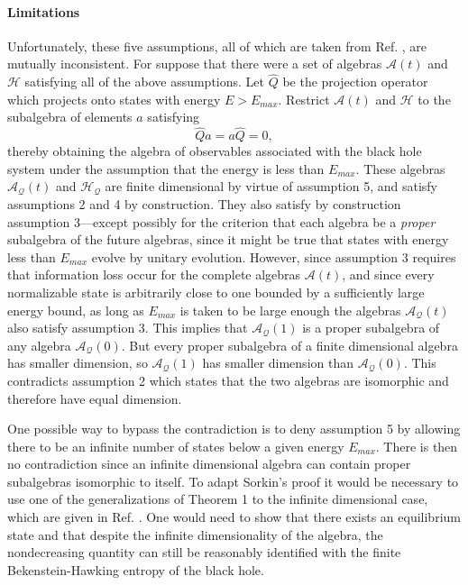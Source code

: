 \documentclass[12pt]{article}
\begin{document}
\paragraph{Limitations}

Unfortunately, these five assumptions, all of which are taken from Ref. \cite{sorkin86}, are mutually inconsistent.  For suppose that there were a set of algebras $\mathcal{A}(t)$ and $\mathcal{H}$ satisfying all of the above assumptions.  Let $\hat{Q}$ be the projection operator which projects onto states with energy $E > E_{max}$.  Restrict $\mathcal{A}(t)$ and $\mathcal{H}$ to the subalgebra of elements $a$ satisfying
\begin{equation}
\hat{Q}a = a\hat{Q} = 0,
\end{equation}
thereby obtaining the algebra of observables associated with the black hole system under the assumption that the energy is less than $E_{max}$.  These algebras $\mathcal{A_Q}(t)$ and $\mathcal{H_Q}$ are finite dimensional by virtue of assumption 5, and satisfy assumptions 2 and 4 by construction.  They also satisfy by construction assumption 3---except possibly for the criterion that each algebra be a \emph{proper} subalgebra of the future algebras, since it might be true that states with energy less than $E_{max}$ evolve by unitary evolution.  However, since assumption 3 requires that information loss occur for the complete algebras $\mathcal{A}(t)$, and since every normalizable state is arbitrarily close to one bounded by a sufficiently large energy bound, as long as $E_{max}$ is taken to be large enough the algebras $\mathcal{A_Q}(t)$ also satisfy assumption 3.  This implies that $\mathcal{A_Q}(1)$ is a proper subalgebra of any algebra $\mathcal{A_Q}(0)$.  But every proper subalgebra of a finite dimensional algebra has smaller dimension, so $\mathcal{A_Q}(1)$ has smaller dimension than $\mathcal{A_Q}(0)$.  This contradicts assumption 2 which states that the two algebras are isomorphic and therefore have equal dimension.

One possible way to bypass the contradiction is to deny assumption 5 by allowing there to be an infinite number of states below a given energy $E_{max}$.  There is then no contradiction since an infinite dimensional algebra can contain proper subalgebras isomorphic to itself.  To adapt Sorkin's proof it would be necessary to use one of the generalizations of Theorem 1 to the infinite dimensional case, which are given in Ref. \cite{lindblad75}.  One would need to show that there exists an equilibrium state and that despite the infinite dimensionality of the algebra, the nondecreasing quantity can still be reasonably identified with the finite Bekenstein-Hawking entropy of the black hole.
\end{document}
